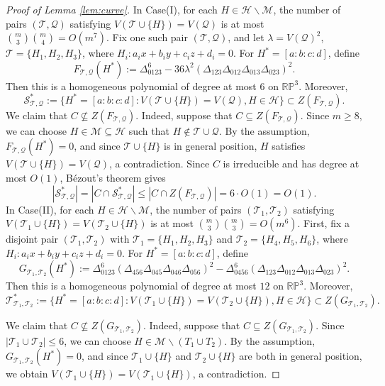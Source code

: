 \documentclass[a4paper,oneside,10pt]{amsart}
\begin{document}
\begin{proof}[Proof of Lemma \ref{lem:curve}]
In Case(I), for each $H \in \mathcal{H} \backslash \mathcal{M}$, the number of pairs $(\mathcal{T}, \mathcal{Q})$ satisfying $V(\mathcal{T} \cup \{ H \} ) = V(\mathcal{Q})$ is at most $\binom{m}{3} \binom{m}{4} = O(m^7)$. Fix one such pair $(\mathcal{T}, \mathcal{Q})$, and let $\lambda = V(\mathcal{Q})^2$, $\mathcal{T} = \{ H_1, H_2, H_3 \}$, where $H_i: a_i x + b_i y + c_i z + d_i = 0$. For $H^{*} = [a:b:c:d]$, define
$$
F_{\mathcal{T}, \mathcal{Q}} (H^{*})  := \Delta_{0123}^6 - 36 \lambda^2 (\Delta_{123} \Delta_{012} \Delta_{013} \Delta_{023})^2.
$$
Then this is a homogeneous polynomial of degree at most $6$ on $\mathbb{RP}^3$. Moreover,
$$
\mathcal{S}_{\mathcal{T},\mathcal{Q}}^{*} := \{ H^{*} = [a:b:c:d] : V(\mathcal{T} \cup \{ H \} ) = V(\mathcal{Q}), H \in \mathcal{H} \} \subset Z(F_{\mathcal{T},\mathcal{Q}}).
$$
We claim that $C \nsubseteq Z(F_{\mathcal{T},\mathcal{Q}})$.
Indeed, suppose that $C \subseteq Z(F_{\mathcal{T},\mathcal{Q}})$. Since $m \geq 8$, we can choose $H \in \mathcal{M} \subseteq \mathcal{H}$ such that $H \notin \mathcal{T} \cup \mathcal{Q}$. By the assumption, $F_{\mathcal{T}, \mathcal{Q}} (H^{*}) = 0$, and since $\mathcal{T} \cup \{ H \}$ is in general position, $H$ satisfies $V(\mathcal{T} \cup \{ H \}) = V (\mathcal{Q})$, a contradiction.
Since $C$ is irreducible and has degree at most $O(1)$, Bézout's theorem gives
$$
|\mathcal{S}_{\mathcal{T}, \mathcal{Q}}^{*}| =|C \cap \mathcal{S}_{\mathcal{T}, \mathcal{Q}}^{*}| \leq |C \cap Z(F_{\mathcal{T},\mathcal{Q}})| = 6 \cdot O(1) = O(1).
$$
In Case(II), for each $H \in \mathcal{H} \backslash \mathcal{M}$, the number of pairs $(\mathcal{T}_1, \mathcal{T}_2)$ satisfying $V(\mathcal{T}_1  \cup \{ H \} ) = V(\mathcal{T}_2 \cup \{ H \})$ is at most $\binom{m}{3} \binom{m}{3} = O(m^6)$.
First, fix a disjoint pair $(\mathcal{T}_1,\mathcal{T}_2)$ with $\mathcal{T}_1 = \{ H_1, H_2, H_3 \}$ and $\mathcal{T}_2 = \{ H_4, H_5, H_6 \}$, where $H_i: a_i x + b_i y + c_i z + d_i = 0$. For $H^{*} = [a:b:c:d]$, define
$$
G_{\mathcal{T}_1, \mathcal{T}_2} (H^{*})  :=  \Delta_{0123}^6 (\Delta_{456} \Delta_{045} \Delta_{046} \Delta_{056})^2 - \Delta_{0456}^6 (\Delta_{123} \Delta_{012} \Delta_{013} \Delta_{023})^2.
$$
Then this is a homogeneous polynomial of degree at most $12$ on $\mathbb{RP}^3$. Moreover,
$$
\mathcal{T}_{\mathcal{T}_1,\mathcal{T}_2}^{*} := \{ H^{*} = [a:b:c:d] : V(\mathcal{T}_1 \cup \{ H \} ) = V(\mathcal{T}_2 \cup \{ H \}), H \in \mathcal{H} \} \subset Z(G_{\mathcal{T}_1,\mathcal{T}_2}).
$$

We claim that $C \nsubseteq  Z(G_{\mathcal{T}_1,\mathcal{T}_2})$.
Indeed, suppose that $C \subseteq  Z(G_{\mathcal{T}_1,\mathcal{T}_2})$. Since $|\mathcal{T}_1 \cup \mathcal{T}_2| \leq 6$, we can choose $H \in \mathcal{M} \backslash (T_1 \cup T_2)$. By the assumption, $G_{\mathcal{T}_1, \mathcal{T}_2} (H^{*}) = 0$, and since $\mathcal{T}_1 \cup \{ H \}$ and $\mathcal{T}_2 \cup \{ H \}$ are both in general position, we obtain $V(\mathcal{T}_1 \cup \{ H \}) = V(\mathcal{T}_1 \cup \{ H \})$, a contradiction.


\end{proof}
\end{document}
